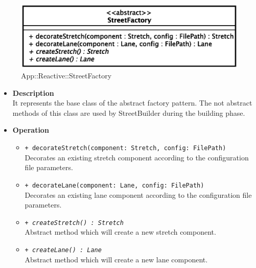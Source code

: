 \begin{figure}[h]
\centering
\includegraphics[scale=0.6,keepaspectratio]{images/solution/street_factory.eps}
\caption{App::Reactive::StreetFactory}
\label{fig:sd-app-street-factory}
\end{figure}
\FloatBarrier
\begin{itemize}
  \item \textbf{Description} \\
    It represents the base class of the abstract factory pattern. The 
not abstract methods of this class are used by StreetBuilder during the
building phase.
  \item \textbf{Operation} \\
  \begin{itemize} 
    \item \texttt{+ decorateStretch(component: Stretch, config: FilePath)} \\
Decorates an existing stretch component according to the configuration file parameters.
    \item \texttt{+ decorateLane(component: Lane, config: FilePath)} \\
Decorates an existing lane component according to the configuration file parameters.
    \item \texttt{\textit{+ createStretch() : Stretch}} \\
Abstract method which will create a new stretch component.
    \item \texttt{\textit{+ createLane() : Lane}} \\
Abstract method which will create a new lane component.
  \end{itemize}
\end{itemize}
